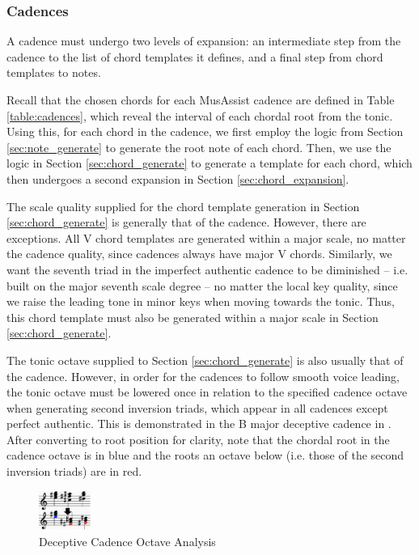 \documentclass{article}
\begin{document}
\subsubsection{Cadences}
A cadence must undergo two levels of expansion: an intermediate step from the cadence to the list of chord templates it defines, and a final step from chord templates to notes.

Recall that the chosen chords for each MusAssist cadence are defined in Table \ref{table:cadences}, which reveal the interval of each chordal root from the tonic. Using this, for each chord in the cadence, we first employ the logic from Section \ref{sec:note_generate} to generate the root note of each chord. Then, we use the logic in Section \ref{sec:chord_generate} to generate a template for each chord, which then undergoes a second expansion in Section \ref{sec:chord_expansion}.

The scale quality supplied for the chord template generation in Section \ref{sec:chord_generate} is generally that of the cadence. However, there are exceptions. All V chord templates are generated within a major scale, no matter the cadence quality, since cadences always have major V chords. Similarly, we want the seventh triad in the imperfect authentic cadence to be diminished – i.e. built on the major seventh scale degree – no matter the local key quality, since we raise the leading tone in minor keys when moving towards the tonic. Thus, this chord template must also be generated within a major scale in Section \ref{sec:chord_generate}.

The tonic octave supplied to Section \ref{sec:chord_generate} is also usually that of the cadence. However, in order for the cadences to follow smooth voice leading, the tonic octave must be lowered once in relation to the specified cadence octave when generating second inversion triads, which appear in all cadences except perfect authentic. This is demonstrated in the B major deceptive cadence in . After converting to root position for clarity, note that the chordal root in the cadence octave is in blue and the roots an octave below (i.e. those of the second inversion triads) are in red.

\begin{figure}[h!]
\centering
\includegraphics[width=0.15\textwidth]{images/cadence_octaves}
  \caption{Deceptive Cadence Octave Analysis}\label{fig:cadence_octaves}
  \vspace{-3mm}
\end{figure}
\end{document}

